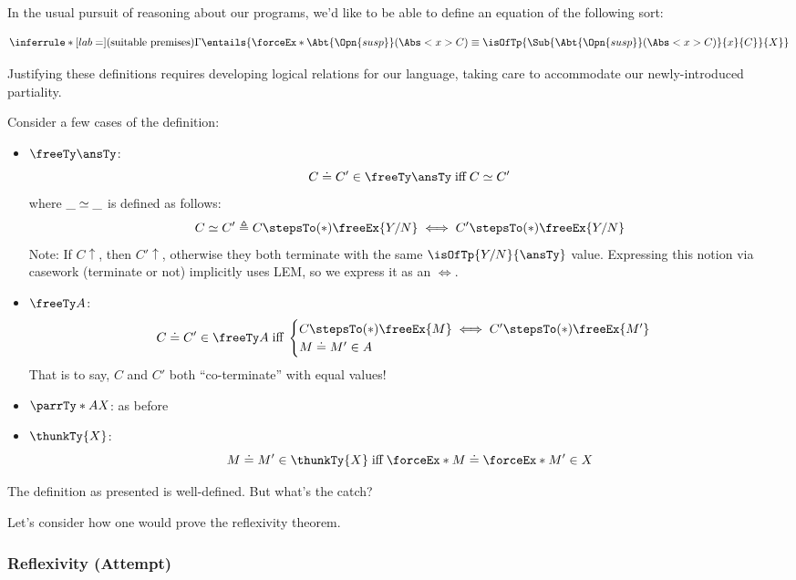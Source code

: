 \documentclass[letterpaper]{article}
\newcommand{\rSuspEx}[2]{\Abt{\Opn{susp}}(\Abs<#1>{#2})}
\newcommand{\iffdefn}[2]{#1 \; \text{iff} \; #2 }
\begin{document}
In the usual pursuit of reasoning about our programs,
we'd like to be able to define an equation of the
following sort:

\[
    \defrule
    {\text{(suitable premises)}}
    {\Gamma \entails{\forceEx*{\rSuspEx{x}{C}} \equiv \isOfTp{\Sub{\rSuspEx{x}{C}}{x}{C}}{X}}}
\]

Justifying these definitions requires developing logical relations for our language, taking care to accommodate our newly-introduced partiality.

\begin{definition}
    Consider a few cases of the definition:

    \begin{itemize}
        \item $\freeTy \ansTy$:
        \[
            \iffdefn
            {\semEq{C}{C'}{\freeTy \ansTy}}
            {\kleeneEq{C}{C'}}
        \]
        where $\_\mathrel{\simeq}\_$ is defined as follows:
        \[
            \kleeneEq{C}{C'} \triangleq 
            C \stepsTo(\ast) \freeEx{Y/N} \iff C' \stepsTo(\ast) \freeEx{Y/N}
        \]
        Note: If $C\uparrow$, then $C'\uparrow$, otherwise they both terminate with the same $\isOfTp{Y/N}{\ansTy}$ value. Expressing this notion via casework (terminate or not) implicitly uses LEM, so we express it as an $\iff$.
        \item $\freeTy A$:
        \[
            \iffdefn
            {\semEq{C}{C'}{\freeTy A}}
            {\begin{cases}
          C \stepsTo(\ast) \freeEx{M} \iff C' \stepsTo(\ast) \freeEx{M'} \\
          \semEq{M}{M'}{A}
          \end{cases}}
        \]
        That is to say, $C$ and $C'$ both ``co-terminate'' with equal values!
        \item $\parrTy*{A}{X}$: as before
        \item $\thunkTy{X}$:
        \[
            \iffdefn
            {\semEq{M}{M'}{\thunkTy{X}}}
            {\semEq{\forceEx*{M}}{\forceEx*{M'}}{X}}
        \]
    \end{itemize}
\end{definition}

The definition as presented is well-defined. But what's the catch? 

Let's consider how one would prove the reflexivity theorem.
\subsubsection{Reflexivity (Attempt)}
\end{document}
